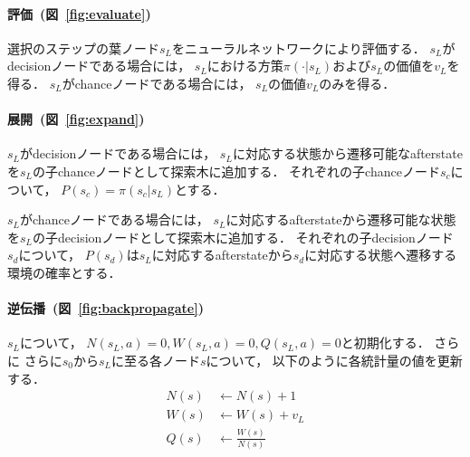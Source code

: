 \paragraph{評価~(図~\ref{fig:evaluate})}
選択のステップの葉ノード$s_L$をニューラルネットワークにより評価する．
$s_L$がdecisionノードである場合には， $s_L$における方策$\pi(\cdot|s_L)$および$s_L$の価値を$v_L$を得る．
$s_L$がchanceノードである場合には， $s_L$の価値$v_L$のみを得る．

\paragraph{展開~(図~\ref{fig:expand})}
$s_L$がdecisionノードである場合には， $s_L$に対応する状態から遷移可能なafterstateを$s_L$の子chanceノードとして探索木に追加する．
それぞれの子chanceノード$s_c$について， $P(s_c) = \pi(s_c|s_L)$とする．

$s_L$がchanceノードである場合には， $s_L$に対応するafterstateから遷移可能な状態を$s_L$の子decisionノードとして探索木に追加する．
それぞれの子decisionノード$s_d$について， $P(s_d)$は$s_L$に対応するafterstateから$s_d$に対応する状態へ遷移する環境の確率とする．

\paragraph{逆伝播~(図~\ref{fig:backpropagate})}
$s_L$について， $N(s_L, a)=0, W(s_L, a)=0, Q(s_L, a)=0$と初期化する．
さらに
さらに$s_0$から$s_L$に至る各ノード$s$について， 以下のように各統計量の値を更新する．
\begin{align*}
  N(s) &\leftarrow N(s) + 1 \\
  W(s) &\leftarrow W(s) + v_L \\
  Q(s) &\leftarrow \frac{W(s)}{N(s)}
\end{align*}


